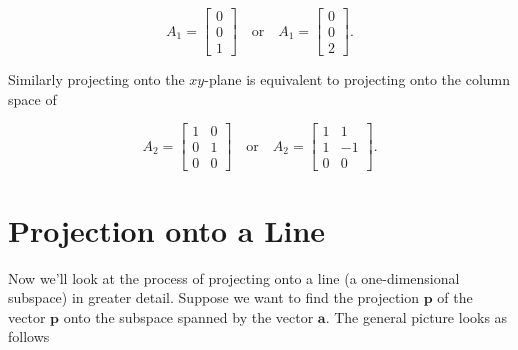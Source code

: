 \documentclass[12pt]{article}
\newcommand{\nin}{\noindent}
\newcommand{\vthree}{\vspace{3mm}}
\newcommand{\mymat}[1]{
\left[
\begin{array}{rrrrrrrrrrrrrrrrrrrrrrrrrrrrrrrrrrrrrrr}
#1
\end{array}
\right]
}
\newcommand{\bp}{\mathbf{p}}
\newcommand{\ba}{\mathbf{a}}
\begin{document}
\[
A_1 = \mymat{0 \\ 0 \\ 1} \quad \textrm{or} \quad A_1 = \mymat{0 \\ 0 \\ 2}.
\]

\vthree

\nin Similarly projecting onto the $xy$-plane is equivalent to projecting onto the column space of

\[
A_2 = \mymat{1 & 0 \\ 0 & 1 \\ 0 & 0 } \quad \textrm{or} \quad A_2 = \mymat{1 & 1 \\ 1 & -1 \\ 0 & 0}.
\]

\vthree

\section*{Projection onto a Line}

\vthree

\nin Now we'll look at the process of projecting onto a line (a one-dimensional subspace) in greater detail.  Suppose we want to find the projection $\bp$ of the vector $\bp$ onto the subspace spanned by the vector $\ba$.  The general picture looks as follows

\end{document}

